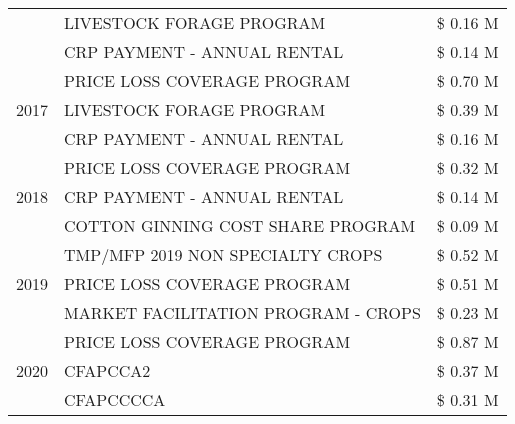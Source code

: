\begin{tabular}{llr}
 & LIVESTOCK FORAGE PROGRAM                      & \$ 0.16 M \\
 & CRP PAYMENT - ANNUAL RENTAL                   & \$ 0.14 M \\
\cline{1-3}
\multirow[t]{3}{*}{2017} & PRICE LOSS COVERAGE PROGRAM & \$ 0.70 M \\
 & LIVESTOCK FORAGE PROGRAM & \$ 0.39 M \\
 & CRP PAYMENT - ANNUAL RENTAL & \$ 0.16 M \\
\cline{1-3}
\multirow[t]{3}{*}{2018} & PRICE LOSS COVERAGE PROGRAM & \$ 0.32 M \\
 & CRP PAYMENT - ANNUAL RENTAL & \$ 0.14 M \\
 & COTTON GINNING COST SHARE PROGRAM & \$ 0.09 M \\
\cline{1-3}
\multirow[t]{3}{*}{2019} & TMP/MFP 2019 NON SPECIALTY CROPS & \$ 0.52 M \\
 & PRICE LOSS COVERAGE PROGRAM & \$ 0.51 M \\
 & MARKET FACILITATION PROGRAM - CROPS & \$ 0.23 M \\
\cline{1-3}
\multirow[t]{3}{*}{2020} & PRICE LOSS COVERAGE PROGRAM & \$ 0.87 M \\
 & CFAPCCA2 & \$ 0.37 M \\
 & CFAPCCCCA & \$ 0.31 M \\
\cline{1-3}
\bottomrule
\end{tabular}
